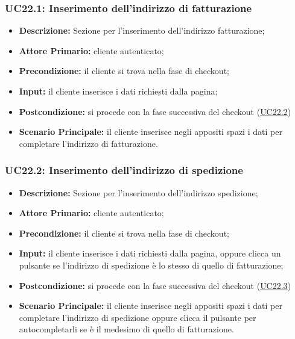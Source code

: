             \subsubsection{UC22.1: Inserimento dell'indirizzo di fatturazione}
            \label{sec:UC22.1}
                \begin{itemize}
                    \item \textbf{Descrizione:} Sezione per l'inserimento dell'indirizzo fatturazione;
                    \item \textbf{Attore Primario:} cliente autenticato;
                    \item \textbf{Precondizione:} il cliente si trova nella fase di checkout;
                    \item \textbf{Input:} il cliente inserisce i dati richiesti dalla pagina;
                    \item \textbf{Postcondizione:} si procede con la fase successiva del checkout (\hyperref[sec:UC22.2]{\underline{UC22.2}})
                    \item \textbf{Scenario Principale:} il cliente inserisce negli appositi spazi i dati per completare l'indirizzo di fatturazione.
                \end{itemize}
            \subsubsection{UC22.2: Inserimento dell'indirizzo di spedizione}
            \label{sec:UC22.2}
                \begin{itemize}
                    \item \textbf{Descrizione:} Sezione per l'inserimento dell'indirizzo spedizione;
                    \item \textbf{Attore Primario:} cliente autenticato;
                    \item \textbf{Precondizione:} il cliente si trova nella fase di checkout;
                    \item \textbf{Input:} il cliente inserisce i dati richiesti dalla pagina, oppure clicca un pulsante se l'indirizzo di spedizione è lo stesso di quello di fatturazione;
                    \item \textbf{Postcondizione:} si procede con la fase successiva del checkout (\hyperref[sec:UC22.3]{\underline{UC22.3}})
                    \item \textbf{Scenario Principale:} il cliente inserisce negli appositi spazi i dati per completare l'indirizzo di spedizione oppure clicca il pulsante per autocompletarli se è il medesimo di quello di fatturazione.
                \end{itemize}
